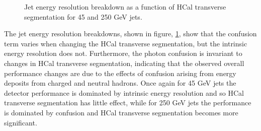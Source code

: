 \begin{figure}
\centering
{}
\caption[Jet energy resolution breakdown as a function of HCal transverse segmentation for 45 and 250 GeV jets.]{Jet energy resolution breakdown as a function of HCal transverse segmentation for 45 and 250 GeV jets.}
\label{fig:hcalcellsizebreak}
\end{figure}

The jet energy resolution breakdowns, shown in figure, \ref{fig:hcalcellsizebreak}, show that the confusion term varies when changing the HCal transverse segmentation, but the intrinsic energy resolution does not.  Furthermore, the photon confusion is invariant to changes in HCal transverse segmentation, indicating that the observed overall performance changes are due to the effects of confusion arising from energy deposits from charged and neutral hadrons.  Once again for 45 GeV jets the detector performance is dominated by intrinsic energy resolution and so HCal transverse segmentation has little effect, while for 250 GeV jets the performance is dominated by confusion and HCal transverse segmentation becomes more significant.  

